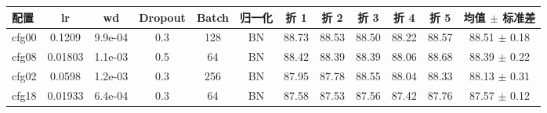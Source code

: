 \begin{tabular}{lccccccccccc}
\toprule
配置 & lr & wd & Dropout & Batch & 归一化 & 折 1 & 折 2 & 折 3 & 折 4 & 折 5 & 均值 $\pm$ 标准差 \\
\midrule
cfg00 & 0.1209 & 9.9e-04 & 0.3 & 128 & BN & 88.73 & 88.53 & 88.50 & 88.22 & 88.57 & 88.51 $\pm$ 0.18 \\
cfg08 & 0.01803 & 1.1e-03 & 0.5 & 64 & BN & 88.42 & 88.39 & 88.39 & 88.06 & 88.68 & 88.39 $\pm$ 0.22 \\
cfg02 & 0.0598 & 1.2e-03 & 0.3 & 256 & BN & 87.95 & 87.78 & 88.55 & 88.04 & 88.33 & 88.13 $\pm$ 0.31 \\
cfg18 & 0.01933 & 6.4e-04 & 0.3 & 64 & BN & 87.58 & 87.53 & 87.56 & 87.42 & 87.76 & 87.57 $\pm$ 0.12 \\
\bottomrule
\end{tabular}
